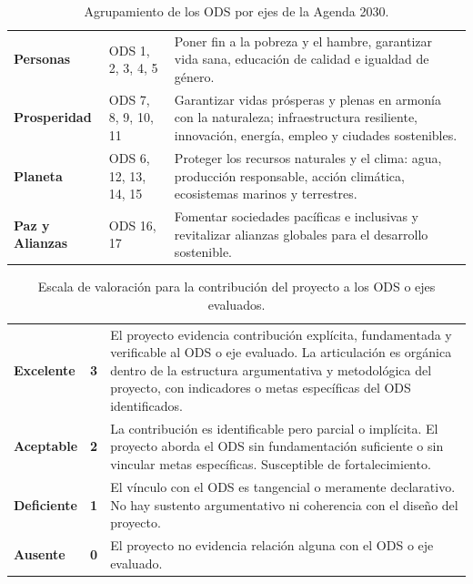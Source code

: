 \begin{table}[htbp]
\centering
\scriptsize
\caption{Agrupamiento de los ODS por ejes de la Agenda 2030.}
\label{tab:ejes-agenda2030}
\begin{tabularx}{\textwidth}{|L{2.5cm}|L{3.8cm}|X|}
\hline
{}
 &  &  \\ \hline
\textbf{Personas} & ODS 1, 2, 3, 4, 5 & Poner fin a la pobreza y el hambre, garantizar vida sana, educación de calidad e igualdad de género. \\ \hline
{}
\textbf{Prosperidad} & ODS 7, 8, 9, 10, 11 & Garantizar vidas prósperas y plenas en armonía con la naturaleza; infraestructura resiliente, innovación, energía, empleo y ciudades sostenibles. \\ \hline
\textbf{Planeta} & ODS 6, 12, 13, 14, 15 & Proteger los recursos naturales y el clima: agua, producción responsable, acción climática, ecosistemas marinos y terrestres. \\ \hline
{}
\textbf{Paz y Alianzas} & ODS 16, 17 & Fomentar sociedades pacíficas e inclusivas y revitalizar alianzas globales para el desarrollo sostenible. \\ \hline
\end{tabularx}
\end{table}

\begin{table}[htbp]
\centering
\scriptsize
\caption{Escala de valoración para la contribución del proyecto a los ODS o ejes evaluados.}
\label{tab:escala-valoracion-ods}
\begin{tabularx}{\textwidth}{|C{2.8cm}|C{1cm}|X|}
\hline
{}
 &  &  \\ \hline
\textcolor{csuf}{\textbf{Excelente}} & \textbf{3} & El proyecto evidencia contribución explícita, fundamentada y verificable al ODS o eje evaluado. La articulación es orgánica dentro de la estructura argumentativa y metodológica del proyecto, con indicadores o metas específicas del ODS identificados. \\ \hline
{}
\textcolor{cace}{\textbf{Aceptable}} & \textbf{2} & La contribución es identificable pero parcial o implícita. El proyecto aborda el ODS sin fundamentación suficiente o sin vincular metas específicas. Susceptible de fortalecimiento. \\ \hline
\textcolor{cdef}{\textbf{Deficiente}} & \textbf{1} & El vínculo con el ODS es tangencial o meramente declarativo. No hay sustento argumentativo ni coherencia con el diseño del proyecto. \\ \hline
{}
\textcolor{cins}{\textbf{Ausente}} & \textbf{0} & El proyecto no evidencia relación alguna con el ODS o eje evaluado. \\ \hline
\end{tabularx}
\end{table}

